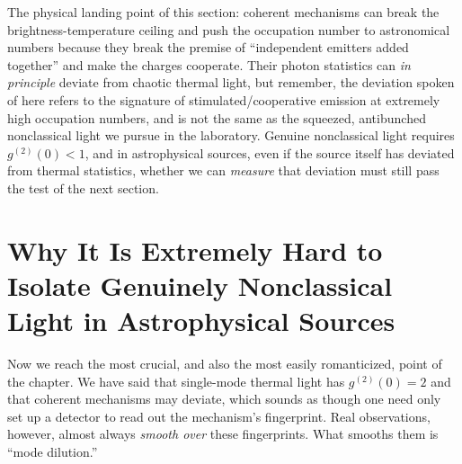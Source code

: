 The physical landing point of this section: coherent mechanisms can break the brightness-temperature ceiling and push the occupation number to astronomical numbers because they break the premise of ``independent emitters added together'' and make the charges cooperate. Their photon statistics can \emph{in principle} deviate from chaotic thermal light, but remember, the deviation spoken of here refers to the signature of stimulated/cooperative emission at extremely high occupation numbers, and is not the same as the squeezed, antibunched nonclassical light we pursue in the laboratory. Genuine nonclassical light requires \(g^{(2)}(0)<1\), and in astrophysical sources, even if the source itself has deviated from thermal statistics, whether we can \emph{measure} that deviation must still pass the test of the next section.

\section{Why It Is Extremely Hard to Isolate Genuinely Nonclassical Light in Astrophysical Sources}
\label{sec:e16-dilution}

Now we reach the most crucial, and also the most easily romanticized, point of the chapter. We have said that single-mode thermal light has \(g^{(2)}(0)=2\) and that coherent mechanisms may deviate, which sounds as though one need only set up a detector to read out the mechanism's fingerprint. Real observations, however, almost always \emph{smooth over} these fingerprints. What smooths them is ``mode dilution.''

